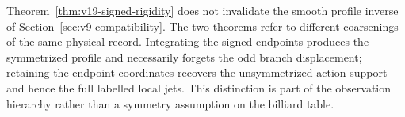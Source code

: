 \begin{remark}
Theorem~\ref{thm:v19-signed-rigidity} does not invalidate the smooth
profile inverse of Section~\ref{sec:v9-compatibility}.  The two theorems
refer to different coarsenings of the same physical record.  Integrating
the signed endpoints produces the symmetrized profile and necessarily
forgets the odd branch displacement; retaining the endpoint coordinates
recovers the unsymmetrized action support and hence the full labelled local
jets.  This distinction is part of the observation hierarchy rather than a
symmetry assumption on the billiard table.
\end{remark}
